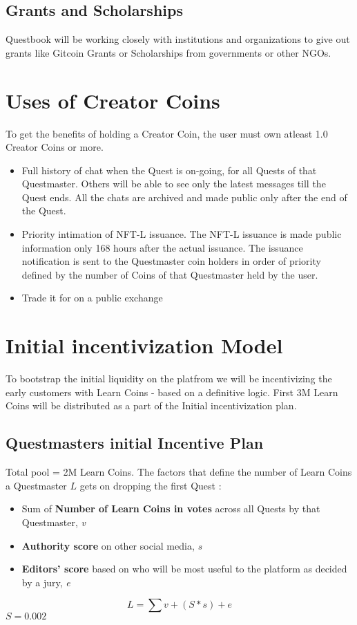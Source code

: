 \documentclass{article}
\begin{document}
    \subsection{Grants and Scholarships}
      Questbook will be working closely with institutions and organizations to give out grants like Gitcoin Grants or Scholarships from governments or other NGOs.
  \section{Uses of Creator Coins}
    To get the benefits of holding a Creator Coin, the user must own atleast 1.0 Creator Coins or more. 
    \begin{itemize}
      \item Full history of chat when the Quest is on-going, for all Quests of that Questmaster. Others will be able to see only the latest messages till the Quest ends. All the chats are archived and made public only after the end of the Quest.
      \item Priority intimation of NFT-L issuance. The NFT-L issuance is made public information only 168 hours after the actual issuance. The issuance notification is sent to the Questmaster coin holders in order of priority defined by the number of Coins of that Questmaster held by the user.
      \item Trade it for on a public exchange
    \end{itemize}

  \section{Initial incentivization Model}
    To bootstrap the initial liquidity on the platfrom we will be incentivizing the early customers with Learn Coins - based on a definitive logic.
    First 3M Learn Coins will be distributed as a part of the Initial incentivization plan.
    \subsection{Questmasters initial Incentive Plan}
      Total pool = 2M Learn Coins.
      The factors that define the number of Learn Coins a Questmaster \(L\) gets on dropping the first Quest :
      \begin{itemize}
        \item Sum of \textbf{Number of Learn Coins in votes} across all Quests by that Questmaster, \textit{v}
        \item \textbf{Authority score} on other social media, \textit{s}
        \item \textbf{Editors' score} based on who will be most useful to the platform as decided by a jury, \textit{e}
      \end{itemize} 
      \[
        L = \sum v + (S * s) + e
      \]
      \(S = 0.002\)
\end{document}
